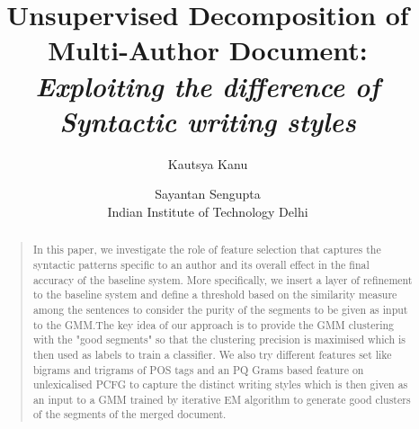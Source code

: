\documentclass[letterpaper]{article}
\begin{document}
%
\title{Unsupervised Decomposition of Multi-Author Document:\\\textit{Exploiting the difference of Syntactic writing styles}}
\author{Kautsya Kanu \and   Sayantan Sengupta\\ 
Indian Institute of Technology Delhi\\
}
\maketitle

 \begin{abstract}
 \begin{quote}
In this paper, we investigate the role of feature  selection  that captures the syntactic patterns specific to an author and its overall effect in the final accuracy of the baseline system. More specifically, we insert a layer of refinement to the baseline system and define a threshold based on the similarity measure among the sentences to consider the purity of the segments to be given as input to the GMM.The key idea of our approach is to provide the GMM clustering with the "good segments" so that the clustering precision is maximised which is then used as labels to train a classifier. We also try different features set like bigrams and trigrams of POS tags and an PQ Grams based feature on unlexicalised PCFG to capture the distinct writing styles which is then given as an input to a GMM trained by  iterative EM algorithm to generate good clusters of the segments of the merged document.
 \end{quote}
 \end{abstract}
\end{document}
